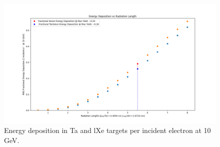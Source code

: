 \documentclass[%
reprint,
amsmath, amssymb,
aps,
floatfix,
]{revtex4-2}
\begin{document}
\begin{figure}[h]
    \includegraphics[width = \linewidth]{../images/CompDeps.png}
    \caption{\label{fig:EDep}Energy deposition in Ta and lXe targets per incident electron at 10 GeV.}
\end{figure}
\end{document}

